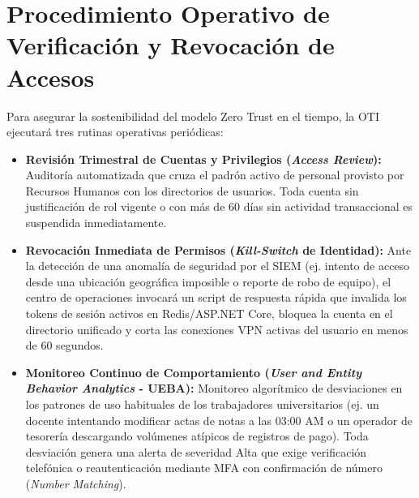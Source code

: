 \section{Procedimiento Operativo de Verificación y Revocación de Accesos}

Para asegurar la sostenibilidad del modelo Zero Trust en el tiempo, la OTI ejecutará tres rutinas operativas periódicas:

\begin{itemize}
    \item \textbf{Revisión Trimestral de Cuentas y Privilegios (\textit{Access Review}):} Auditoría automatizada que cruza el padrón activo de personal provisto por Recursos Humanos con los directorios de usuarios. Toda cuenta sin justificación de rol vigente o con más de 60 días sin actividad transaccional es suspendida inmediatamente.
    \item \textbf{Revocación Inmediata de Permisos (\textit{Kill-Switch} de Identidad):} Ante la detección de una anomalía de seguridad por el SIEM (ej. intento de acceso desde una ubicación geográfica imposible o reporte de robo de equipo), el centro de operaciones invocará un script de respuesta rápida que invalida los tokens de sesión activos en Redis/ASP.NET Core, bloquea la cuenta en el directorio unificado y corta las conexiones VPN activas del usuario en menos de 60 segundos.
    \item \textbf{Monitoreo Continuo de Comportamiento (\textit{User and Entity Behavior Analytics} - UEBA):} Monitoreo algorítmico de desviaciones en los patrones de uso habituales de los trabajadores universitarios (ej. un docente intentando modificar actas de notas a las 03:00 AM o un operador de tesorería descargando volúmenes atípicos de registros de pago). Toda desviación genera una alerta de severidad Alta que exige verificación telefónica o reautenticación mediante MFA con confirmación de número (\textit{Number Matching}).
\end{itemize}